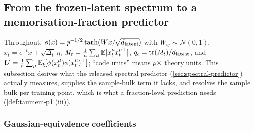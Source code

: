 \subsection{From the frozen-latent spectrum to a memorisation-fraction predictor}
\label{app:theory-predictor}

Throughout, $\phi(x)=p^{-1/2}\tanh(Wx/\sqrt{d_{\mathrm{latent}}})$ with $W_{ij}\sim\mathcal N(0,1)$, $x_t=e^{-t}x+\sqrt{\Delta_t}\,\eta$, $M_t=\frac1{n}\sum_\mu\mathbb{E}[x_t^\mu x_t^{\mu\top}]$, $q_d=\mathrm{tr}(M_t)/d_{\mathrm{latent}}$, and $\bm{U}=\frac1{n}\sum_\mu\mathbb{E}_\xi[\phi(x_t^\mu)\phi(x_t^\mu)^\top]$; ``code units'' means $p\times$ theory units. This subsection derives what the released spectral predictor (\cref{sec:spectral-predictor}) actually measures, supplies the sample-bulk term it lacks, and resolves the sample bulk per training point, which is what a fraction-level prediction needs (\cref{def:taumem-p1}(iii)).

\subsubsection{Gaussian-equivalence coefficients}

